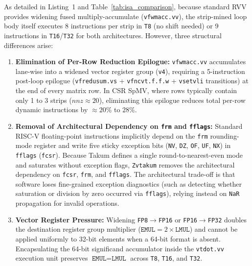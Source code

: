 As detailed in Listing~1 and Table~\ref{tab:isa_comparison}, because standard RVV provides widening fused multiply-accumulate (\texttt{vfwmacc.vv}), the strip-mined loop body itself executes 8 instructions per strip in \texttt{T8} (no shift needed) or 9 instructions in \texttt{T16}/\texttt{T32} for both architectures. However, three structural differences arise:
\begin{enumerate}
    \item \textbf{Elimination of Per-Row Reduction Epilogue:} \texttt{vfwmacc.vv} accumulates lane-wise into a widened vector register group (\texttt{v4}), requiring a 5-instruction post-loop epilogue (\texttt{vfredusum.vs} + \texttt{vfncvt.f.f.w} + \texttt{vsetvli} transitions) at the end of every matrix row. In CSR SpMV, where rows typically contain only 1 to 3 strips ($nnz \approx 20$), eliminating this epilogue reduces total per-row dynamic instructions by $\approx 20\%$ to $28\%$.
    \item \textbf{Removal of Architectural Dependency on \texttt{frm} and \texttt{fflags}:} Standard RISC-V floating-point instructions implicitly depend on the \texttt{frm} rounding-mode register and write five sticky exception bits (\texttt{NV}, \texttt{DZ}, \texttt{OF}, \texttt{UF}, \texttt{NX}) in \texttt{fflags} (\texttt{fcsr}). Because Takum defines a single round-to-nearest-even mode and saturates without exception flags, \texttt{Zvtakum} removes the architectural dependency on \texttt{fcsr}, \texttt{frm}, and \texttt{fflags}. The architectural trade-off is that software loses fine-grained exception diagnostics (such as detecting whether saturation or division by zero occurred via \texttt{fflags}), relying instead on \texttt{NaR} propagation for invalid operations.
    \item \textbf{Vector Register Pressure:} Widening \texttt{FP8}$\to$\texttt{FP16} or \texttt{FP16}$\to$\texttt{FP32} doubles the destination register group multiplier ($\texttt{EMUL} = 2 \times \texttt{LMUL}$) and cannot be applied uniformly to 32-bit elements when a 64-bit format is absent. Encapsulating the 64-bit significand accumulator inside the \texttt{vtdot.vv} execution unit preserves $\texttt{EMUL} = \texttt{LMUL}$ across \texttt{T8}, \texttt{T16}, and \texttt{T32}.
\end{enumerate}

